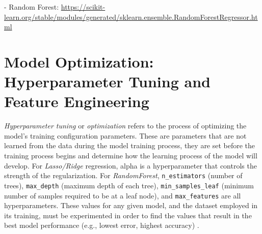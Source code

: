 \documentclass[12pt]{report} %
\begin{document}





- Random Forest: \url{https://scikit-learn.org/stable/modules/generated/sklearn.ensemble.RandomForestRegressor.html}




\section{Model Optimization: Hyperparameter Tuning and Feature Engineering}

\textit{Hyperparameter tuning} or \textit{optimization} refers to the process of optimizing the model's training configuration parameters. These are parameters that are not learned from the data during the model training process, they are set before the training process begins and determine how the learning process of the model will develop. For \textit{Lasso/Ridge} regression, alpha is a hyperparameter that controls the strength of the regularization. For \textit{RandomForest}, \verb|n_estimators| (number of trees), \verb|max_depth| (maximum depth of each tree), \verb|min_samples_leaf| (minimum number of samples required to be at a leaf node), and \verb|max_features| are all hyperparameters. These values for any given model, and the dataset employed in its training, must be experimented in order to find the values that result in the best model performance (e.g., lowest error, highest accuracy) \cite{AWSHyperparameterTuning}.
\end{document}
